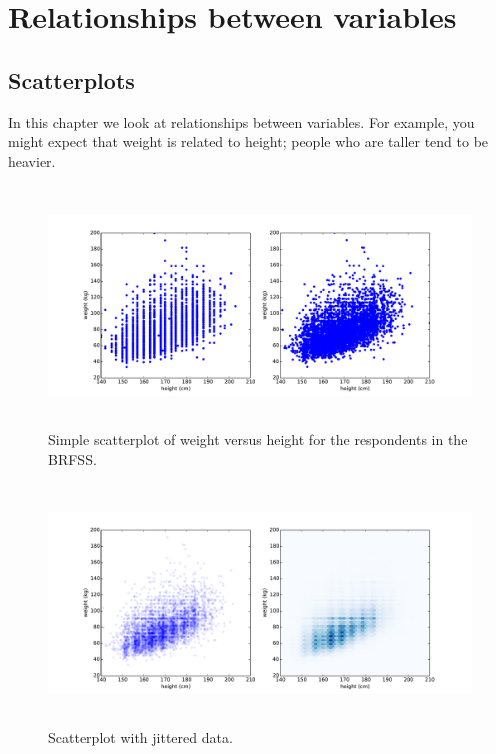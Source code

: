 \documentclass[12pt]{book}
\begin{document}
\chapter{Relationships between variables}

\section{Scatterplots}

In this chapter we look at relationships between variables.  For
example, you might expect that weight is related to height; people who
are taller tend to be heavier.

\begin{figure}
\centerline{\includegraphics[height=2.5in]{figs/scatter1.pdf}}
\caption{Simple scatterplot of weight versus height for the respondents
in the BRFSS.}
\label{scatterplot1}
\end{figure}

\begin{figure}
\centerline{\includegraphics[height=2.5in]{figs/scatter2.pdf}}
\caption{Scatterplot with jittered data.}
\label{scatterplot2}
\end{figure}
\end{document}
